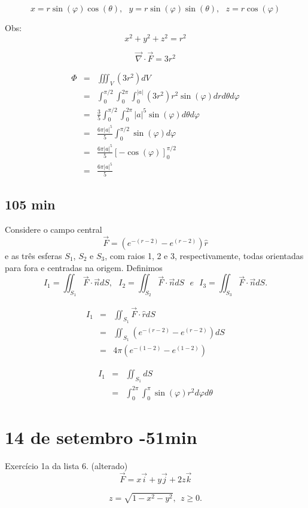 \documentclass[a4paper,10pt]{book}
\begin{document}
 $$x=r\sin(\varphi)\cos(\theta) ,~~~ y=r\sin(\varphi)\sin(\theta), ~~~z=r \cos(\varphi)$$

Obs: $$x^2+y^2+z^2=r^2$$


$$\vec{\nabla}\cdot \vec{F}=3r^2$$

\begin{eqnarray*}\Phi&=&\iiint_V(3r^2)dV\\
&=&\int_0^{\pi/2} \int_0^{2\pi} \int_0^{|a|}(3r^2) r^2\sin(\varphi) dr d\theta d\varphi\\
&=&\frac{3}{5}\int_0^{\pi/2} \int_0^{2\pi} |a|^5\sin(\varphi)  d\theta d\varphi\\
&=&\frac{6\pi|a|^5}{5}\int_0^{\pi/2}  \sin(\varphi)  d\varphi\\
&=&\frac{6\pi|a|^5}{5}\left[-\cos(\varphi)\right]_0^{\pi/2}\\
&=&\frac{6\pi|a|^5}{5}
\end{eqnarray*}


\section{105 min}

Considere o campo central $$\vec {F}=(e^{-(r-2)}-e^{(r-2)})\hat {r}$$
e as três esferas $S_1$, $S_2$ e $S_3$, com raios 1, 2 e 3, respectivamente, todas orientadas para fora e centradas na origem. Definimos $$I_1=\iint _{S_1}\vec {F}\cdot \vec {n}dS,~~~ I_2=\iint _{S_2}\vec {F}\cdot \vec {n}dS ~~~ e  ~~~ I_3=\iint _{S_3}\vec {F}\cdot \vec {n}dS.$$

\begin{eqnarray*}I_1&=&\iint _{S_1}\vec {F}\cdot \hat {r}dS\\
&=&\iint _{S_1}(e^{-(r-2)}-e^{(r-2)})dS\\
&=&4\pi(e^{-(1-2)}-e^{(1-2)})
 \end{eqnarray*}

\begin{eqnarray*}I_1&=&\iint _{S_1}dS\\
&=&\int_0^{2\pi}\int_0^{\pi}\sin(\varphi)r^2d\varphi d\theta
 \end{eqnarray*}

 
 \chapter{14 de setembro -51min}
 
 Exercício 1a da lista 6. (alterado)
 $$\vec{F}=x\vec{i}+y\vec{j}+2z\vec{k}$$
 
$$z=\sqrt{1-x^2-y^2}, ~~z\geq 0.$$
\end{document}
